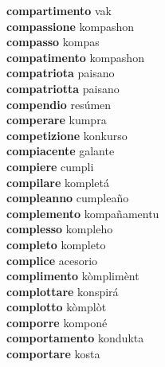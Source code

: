 \textbf{compartimento } vak \\
\textbf{compassione } kompashon \\
\textbf{compasso } kompas \\
\textbf{compatimento } kompashon \\
\textbf{compatriota } paisano \\
\textbf{compatriotta } paisano \\
\textbf{compendio } resúmen \\
\textbf{comperare } kumpra \\
\textbf{competizione } konkurso \\
\textbf{compiacente } galante \\
\textbf{compiere } cumpli \\
\textbf{compilare } kompletá \\
\textbf{compleanno } cumpleaño \\
\textbf{complemento } kompañamentu \\
\textbf{complesso } kompleho \\
\textbf{completo } kompleto \\
\textbf{complice } acesorio \\
\textbf{complimento } kòmplimènt \\
\textbf{complottare } konspirá \\
\textbf{complotto } kòmplòt \\
\textbf{comporre } komponé \\
\textbf{comportamento } kondukta \\
\textbf{comportare } kosta \\
